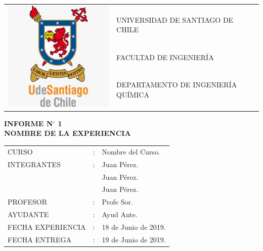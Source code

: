 \documentclass[10pt]{article}
\begin{document}
\begin{titlepage}

\begin{flushleft}
    \begin{tabular}{ll} %
      \multirow{4}{2cm}{\includegraphics[height=0.1\textheight]{imagenes/logo_diq.jpeg} }&UNIVERSIDAD DE SANTIAGO DE CHILE  \\
      &FACULTAD DE INGENIERÍA\\
      &DEPARTAMENTO DE INGENIERÍA QUÍMICA \\
    \end{tabular}
\end{flushleft}


\begin{center}
\vspace*{8cm}
 
\textbf{INFORME N$\bm{^{\circ}}$ 1}\\ %
\textbf{NOMBRE DE LA EXPERIENCIA} 
\vfill 
\end{center}
   
\begin{flushright}
   \begin{tabular}{lll}
   CURSO       &:& Nombre del Curso.\\
   INTEGRANTES &:& Juan Pérez.\\
               & & Juan Pérez.\\
               & & Juan Pérez.\\
   PROFESOR    &:& Profe Sor.\\
   AYUDANTE    &:& Ayud Ante.\\
   FECHA EXPERIENCIA &:& 18 de Junio de 2019.\\
   FECHA ENTREGA     &:& 19 de Junio de 2019.\\
   \end{tabular}
\end{flushright}
\end{titlepage}
\pagestyle{empty} %
\end{document}
